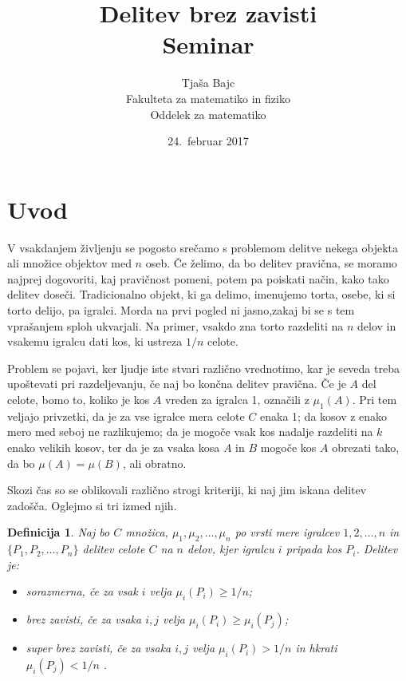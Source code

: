 \documentclass[a4paper,12pt]{article}
\title{Delitev brez zavisti \\ 
\Large Seminar}
\author{Tjaša Bajc \\
Fakulteta za matematiko in fiziko \\
Oddelek za matematiko}
\date{24.\ februar 2017}
\newtheorem{definicija}{Definicija}
\begin{document}


\maketitle



\section{Uvod}

V vsakdanjem življenju se pogosto srečamo s problemom delitve nekega objekta ali množice objektov med $n$ oseb. Če želimo, da bo delitev pravična, se moramo najprej dogovoriti, kaj pravičnost pomeni, potem pa poiskati način, kako tako delitev doseči. Tradicionalno objekt, ki ga delimo, imenujemo torta, osebe, ki si torto delijo, pa igralci. %
Morda na prvi pogled ni jasno,zakaj bi se s tem vprašanjem sploh ukvarjali. Na primer, vsakdo zna torto razdeliti na $n$ delov in vsakemu igralcu dati kos, ki ustreza $1/n$ celote. 

Problem se pojavi, ker ljudje iste stvari različno vrednotimo, kar je seveda treba upoštevati pri razdeljevanju, če naj bo končna delitev pravična. Če je $A$ del celote, bomo to, koliko je kos $A$ vreden za igralca 1, označili z $\mu_1(A)$. Pri tem veljajo privzetki, da je za vse igralce mera celote $C$ enaka 1; %
da kosov z enako mero med seboj ne razlikujemo; da je mogoče vsak kos nadalje razdeliti na $k$ enako velikih kosov, ter da je za vsaka kosa $A$ in $B$ mogoče kos $A$ obrezati tako, da bo $\mu(A) = \mu(B)$, ali obratno.


Skozi čas so se oblikovali različno strogi kriteriji, ki naj jim iskana delitev zadošča. Oglejmo si tri izmed njih.

\begin{definicija}
Naj bo $C$ množica, $\mu_1, \mu_2, \ldots, \mu_n$ po vrsti mere igralcev $1, 2, \ldots, n$ in $\{P_1, P_2, \ldots, P_n\}$ delitev celote $C$ na $n$ delov, kjer igralcu $i$ pripada kos $P_i$. Delitev je:

\begin{itemize}
\item {\em sorazmerna\/}, če za vsak $i$ velja $\mu_i(P_i) \geq 1/n$;
\item {\em brez zavisti\/}, če za vsaka $i, j$ velja $\mu_i(P_i) \geq \mu_i(P_j)$;
\item{\em super brez zavisti\/}, če za vsaka $i, j$ velja $\mu_i(P_i) > 1/n$ in hkrati $\mu_i(P_j) < 1/n$ .								
\end{itemize}

\end{definicija}
\end{document}
